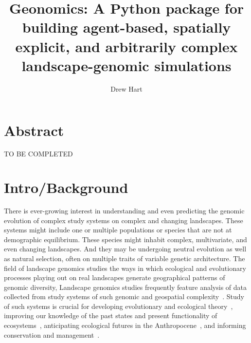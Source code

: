 ﻿\documentclass{article}
\title{Geonomics: A Python package for building agent-based, spatially explicit, and arbitrarily complex landscape-genomic simulations}
\author{Drew Hart}
\begin{document}
\maketitle


\section{Abstract}
{\LARGE TO BE COMPLETED}


\section{Intro/Background}
There is ever-growing interest in understanding and even predicting
the genomic evolution of complex study systems on complex and changing landscapes.
These systems might include one or multiple populations or species that are not
at demographic equilibrium. These species might inhabit complex, multivariate, and even changing landscapes.
And they may be undergoing neutral evolution as well as natural selection,
often on multiple traits of variable genetic architecture.
The field of landscape genomics studies the ways in which ecological and evolutionary
processes playing out on real landscapes
generate geographical patterns of genomic diversity,
Landscape genomics studies frequently feature analysis of data collected
from study systems of such
genomic and geospatial complexity~\cite{lind,mastretta-yanes,harris,crossley}. 
Study of such systems is crucial for developing
evolutionary and ecological theory~\cite{pelletier,barrett},
improving our knowledge of the past states and present functionality of ecosystems~\cite{mastretta-yanes},
anticipating ecological futures in the Anthropocene~\cite{bay},
and informing conservation and management~\cite{mastretta-yanes,crossley,lind}.
\end{document}
